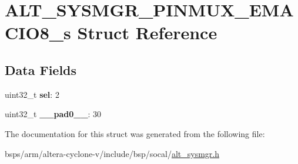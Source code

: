 \hypertarget{structALT__SYSMGR__PINMUX__EMACIO8__s}{}\section{A\+L\+T\+\_\+\+S\+Y\+S\+M\+G\+R\+\_\+\+P\+I\+N\+M\+U\+X\+\_\+\+E\+M\+A\+C\+I\+O8\+\_\+s Struct Reference}
\label{structALT__SYSMGR__PINMUX__EMACIO8__s}
\subsection*{Data Fields}
\begin{DoxyCompactItemize}
\item 
\mbox{\label{structALT__SYSMGR__PINMUX__EMACIO8__s_a98bbec8ba80c1de2199af1d9dd58a570}} 
uint32\+\_\+t {\bfseries sel}\+: 2
\item 
\mbox{\label{structALT__SYSMGR__PINMUX__EMACIO8__s_a2f819e6dc207fa0e0120cb5e49d1ab41}} 
uint32\+\_\+t {\bfseries \+\_\+\+\_\+pad0\+\_\+\+\_\+}\+: 30
\end{DoxyCompactItemize}


The documentation for this struct was generated from the following file\+:\begin{DoxyCompactItemize}
\item 
bsps/arm/altera-\/cyclone-\/v/include/bsp/socal/\mbox{\hyperlink{alt__sysmgr_8h}{alt\+\_\+sysmgr.\+h}}\end{DoxyCompactItemize}
